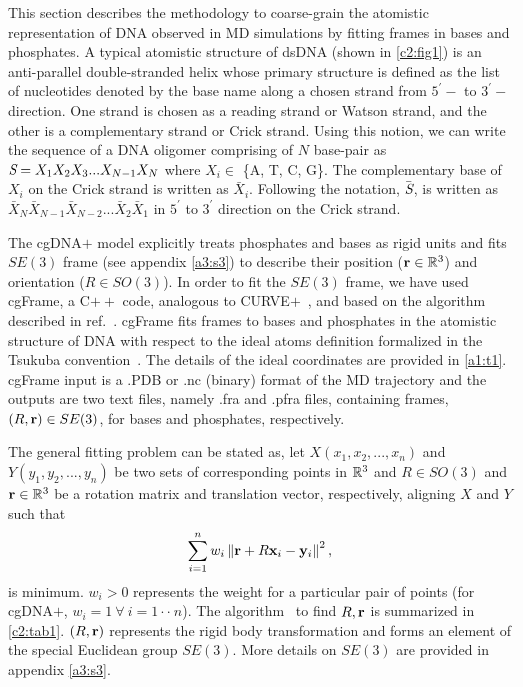 This section describes the methodology to coarse-grain the atomistic representation of DNA observed in MD simulations by fitting frames in bases and phosphates.
A typical atomistic structure of dsDNA (shown in \cref{c2:fig1}) is an anti-parallel double-stranded helix whose primary structure is defined as the list of nucleotides denoted by the base name along a chosen strand from $5^\prime-$ to $3^\prime-$ direction. 
One strand is chosen as a reading strand or Watson strand, and the other is a complementary strand or Crick strand.
Using this notion, we can write the sequence of a DNA oligomer comprising of $N$ base-pair as ${\textit{S}} = X_1X_2X_3...X_{N-1}X_N$ where $X_i \in$ \{A, T, C, G\}.
The complementary base of $X_i$ on the Crick strand is written as $\bar{X}_i$. 
Following the notation, $\bar{{\textit{S}}}$, is written as $\bar{X}_N\bar{X}_{N-1}\bar{X}_{N-2}...\bar{X}_2\bar{X}_1$ in $5^\prime$ to $3^\prime$ direction on the Crick strand. 

The cgDNA$+$ model explicitly treats phosphates and bases as rigid units and fits $SE(3)$ frame (see appendix \cref{a3:s3}) to describe their position ($\mathbf{r} \in {\mathbb R}^3$) and orientation ($R \in SO(3)$).
In order to fit the $SE(3)$ frame, we have used cgFrame, a C$++$  code, analogous to CURVE$+$~\cite{curveplus}, and based on the algorithm described in ref.~\cite{svdfit}.
cgFrame fits frames to bases and phosphates in the atomistic structure of DNA with respect to the ideal atoms definition formalized in the Tsukuba convention~\cite{tsukuba}.
The details of the ideal coordinates are provided in \cref{a1:t1}. cgFrame input is a .PDB or .nc (binary) format of the MD trajectory and the outputs are two text files, namely .fra and .pfra files, containing frames, $(R,\mathbf{r}) \in SE(3)$, for bases and phosphates, respectively.

The general fitting problem can be stated as,
let $X(x_1,x_2,...,x_n)$ and $Y(y_1,y_2,...,y_n)$ be two
sets of corresponding points in ${\mathbb R}^3$ and $R \in SO(3)$ and $\mathbf{r} \in {\mathbb R}^3$ be a
rotation matrix and translation vector, respectively, aligning $X$ and $Y$ such that
\begin{equation}
\centering \sum_{i=1}^{n} w_{i}\norm{ \v r + R \v x_{i} - \v y_i }^{2},
\end{equation}
is minimum. $w_{i}>0$ represents the weight for a particular pair of points
(for cgDNA$+$, $w_i=1 \ \forall \ i = 1 \cdot \cdot \ n$). The algorithm~\cite{svdfit} to find $R,\mathbf{r}$ is summarized in \cref{c2:tab1}. 
$(R,\mathbf{r} )$ represents the rigid body transformation and forms an element of the special Euclidean group $SE(3)$. 
More details on $SE(3)$ are provided in appendix \cref{a3:s3}. 

